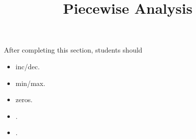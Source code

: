 \documentclass{ximera}
\title{Piecewise Analysis}
\begin{document}
\begin{abstract}
\end{abstract}
\maketitle

\begin{sectionOutcomes}
After completing this section, students should 

\begin{itemize}
\item inc/dec.
\item min/max.
\item zeros.
\item .
\item .
\end{itemize}
\end{sectionOutcomes}
\end{document}
